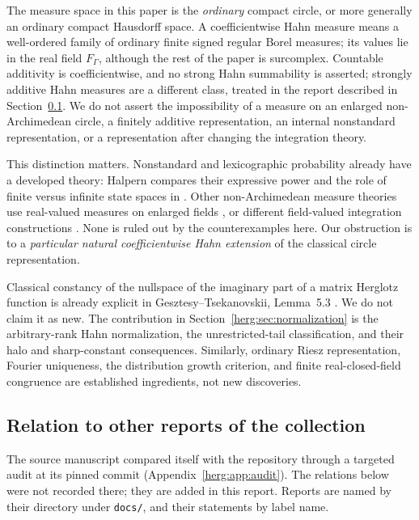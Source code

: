 \documentclass[11pt,letterpaper]{article}
\theoremstyle{definition}
\newcommand{\FG}{F_\Gamma}\newcommand{\KG}{K_\Gamma}
\newcommand{\repo}[1]{\nolinkurl{#1}}%
\numberwithin{equation}{section}
\begin{document}
The measure space in this paper is the \emph{ordinary} compact circle, or more generally an ordinary compact Hausdorff space. A coefficientwise Hahn measure means a well-ordered family of ordinary finite signed regular Borel measures; its values lie in the real field $\FG$, although the rest of the paper is surcomplex. Countable additivity is coefficientwise, and no strong Hahn summability is asserted; strongly additive Hahn measures are a different class, treated in the report described in Section~\ref{herg:sec:position}. We do not assert the impossibility of a measure on an enlarged non-Archimedean circle, a finitely additive representation, an internal nonstandard representation, or a representation after changing the integration theory.

This distinction matters. Nonstandard and lexicographic probability already have a developed theory: Halpern compares their expressive power and the role of finite versus infinite state spaces in \cite{Halpern}. Other non-Archimedean measure theories use real-valued measures on enlarged fields \cite{Bottazzi}, or different field-valued integration constructions \cite{Restrepo}. None is ruled out by the counterexamples here. Our obstruction is to a \emph{particular natural coefficientwise Hahn extension} of the classical circle representation.

Classical constancy of the nullspace of the imaginary part of a matrix Herglotz function is already explicit in Gesztesy--Tsekanovskii, Lemma~5.3 \cite{GT}. We do not claim it as new. The contribution in Section~\ref{herg:sec:normalization} is the arbitrary-rank Hahn normalization, the unrestricted-tail classification, and their halo and sharp-constant consequences. Similarly, ordinary Riesz representation, Fourier uniqueness, the distribution growth criterion, and finite real-closed-field congruence are established ingredients, not new discoveries.

\subsection{Relation to other reports of the collection}
\label{herg:sec:position}

The source manuscript compared itself with the repository through a targeted audit at its pinned commit (Appendix~\ref{herg:app:audit}). The relations below were not recorded there; they are added in this report. Reports are named by their directory under \repo{docs/}, and their statements by label name.
\end{document}
